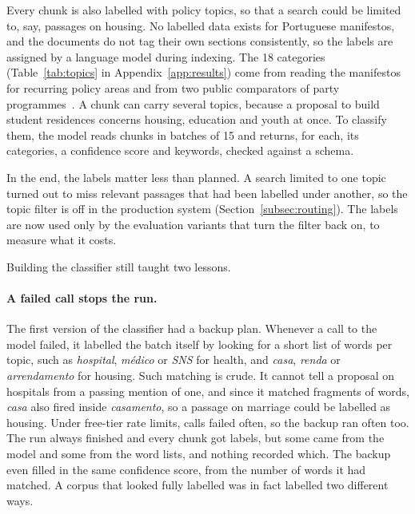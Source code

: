 Every chunk is also labelled with policy topics, so that a search could be
limited to, say, passages on housing. No labelled data exists for Portuguese
manifestos, and the documents do not tag their own sections consistently, so
the labels are assigned by a language model during indexing. The 18 categories
(Table~\ref{tab:topics} in Appendix~\ref{app:results}) come from reading the
manifestos for recurring policy areas and from two public comparators of party
programmes~\citep{expresso-comparador, politicaativa-comparar}. A chunk can
carry several topics, because a proposal to build student residences concerns
housing, education and youth at once. To classify them, the model reads chunks
in batches of 15 and returns, for each, its categories, a confidence score
and keywords, checked against a schema.

In the end, the labels matter less than planned. A search limited to one
topic turned out to miss relevant passages that had been labelled under
another, so the topic filter is off in the production system
(Section~\ref{subsec:routing}). The labels are now used only by the
evaluation variants that turn the filter back on, to measure what it costs.

Building the classifier still taught two lessons.

\paragraph{A failed call stops the run.} The first version of the classifier
had a backup plan. Whenever a call to the model failed, it labelled the batch
itself by looking for a short list of words per topic, such as
\textit{hospital}, \textit{médico} or \textit{SNS} for health, and
\textit{casa}, \textit{renda} or \textit{arrendamento} for housing. Such
matching is crude. It cannot tell a proposal on hospitals from a passing
mention of one, and since it matched fragments of words, \textit{casa} also
fired inside \textit{casamento}, so a passage on marriage could be labelled as
housing. Under free-tier rate limits, calls failed often, so the backup ran
often too. The run always finished and every chunk got labels, but some came
from the model and some from the word lists, and nothing recorded which. The
backup even filled in the same confidence score, from the number of words it
had matched. A
corpus that looked fully labelled was in fact labelled two different ways.

